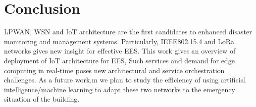 \section{Conclusion} \label{sec:Conclusion}





\ac{LPWAN},
	\ac{WSN} and \ac{IoT} architecture are the first candidates to enhanced disaster monitoring and management systems.
Particularly,
	IEEE802.15.4 and LoRa networks gives new insight for effective \ac{EES}.
This work gives an overview of deployment of \ac{IoT} architecture for \ac{EES},
	Such services and demand for edge computing in real-time poses new architectural and service orchestration challenges.
As a future work,m
	we plan to study the efficiency of using artificial intelligence/machine learning to adapt these two networks to the emergency situation of the building.



